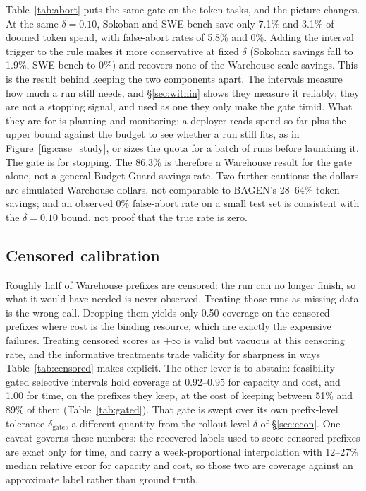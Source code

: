 Table~\ref{tab:abort} puts the same gate on the token tasks, and the picture changes. At the same $\delta{=}0.10$, Sokoban and SWE-bench save only 7.1\% and 3.1\% of doomed token spend, with false-abort rates of 5.8\% and 0\%. Adding the interval trigger to the rule makes it more conservative at fixed $\delta$ (Sokoban savings fall to 1.9\%, SWE-bench to 0\%) and recovers none of the Warehouse-scale savings. This is the result behind keeping the two components apart. The intervals measure how much a run still needs, and \S\ref{sec:within} shows they measure it reliably; they are not a stopping signal, and used as one they only make the gate timid. What they are for is planning and monitoring: a deployer reads spend so far plus the upper bound against the budget to see whether a run still fits, as in Figure~\ref{fig:case_study}, or sizes the quota for a batch of runs before launching it. The gate is for stopping. The 86.3\% is therefore a Warehouse result for the gate alone, not a general Budget Guard savings rate. Two further cautions: the dollars are simulated Warehouse dollars, not comparable to BAGEN's 28--64\% token savings; and an observed 0\% false-abort rate on a small test set is consistent with the $\delta{=}0.10$ bound, not proof that the true rate is zero.

\subsection{Censored calibration}
\label{sec:censored}

Roughly half of Warehouse prefixes are censored: the run can no longer finish, so what it would have needed is never observed. Treating those runs as missing data is the wrong call. Dropping them yields only 0.50 coverage on the censored prefixes where cost is the binding resource, which are exactly the expensive failures. Treating censored scores as $+\infty$ is valid but vacuous at this censoring rate, and the informative treatments trade validity for sharpness in ways Table~\ref{tab:censored} makes explicit. The other lever is to abstain: feasibility-gated selective intervals hold coverage at 0.92--0.95 for capacity and cost, and 1.00 for time, on the prefixes they keep, at the cost of keeping between 51\% and 89\% of them (Table~\ref{tab:gated}). That gate is swept over its own prefix-level tolerance $\delta_{\mathrm{gate}}$, a different quantity from the rollout-level $\delta$ of \S\ref{sec:econ}. One caveat governs these numbers: the recovered labels used to score censored prefixes are exact only for time, and carry a week-proportional interpolation with 12--27\% median relative error for capacity and cost, so those two are coverage against an approximate label rather than ground truth.

